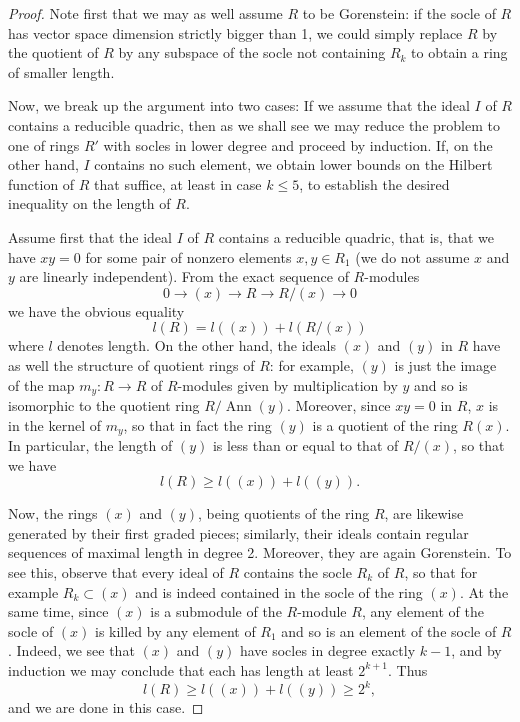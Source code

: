 \documentclass{bull-l}
\newcommand{\Ann}{\operatorname{Ann}}
\theoremstyle{pplain}
\theoremstyle{definition}
\begin{document}
\begin{proof} 
Note first that we may as well assume $R$ to be Gorenstein: if the socle of $R$
has vector space dimension strictly bigger than 1, we could simply replace $R$
by the quotient of $R$ by any subspace of the socle not containing $R_k$ to
obtain a ring of smaller length.

Now, we break up the argument into two cases: If we assume that the ideal $I$
of $R$ contains a reducible quadric, then as we shall see we may reduce the
problem to one of rings $R'$ with socles in lower degree and proceed by
induction.  If, on the other hand, $I$ contains no such element, we obtain lower
bounds on the Hilbert function of $R$ that suffice, at least in case $k\le 5$,
to establish the desired inequality on the length of $R$.

Assume first that the ideal $I$ of $R$ contains a reducible quadric, that is,
that we have $xy=0$ for some pair of nonzero elements $x,y\in  R_1$ (we do not
assume $x$ and $y$ are linearly independent).  From the exact sequence of
$R$-modules 
\[0\to (x)\to R\to R/(x)\to 0\]
we have the obvious equality
\[l(R)=l((x))+l(R/(x))\]
where $l$ denotes length.  On the other hand, the ideals $(x)$ and $(y)$ in $R$
have as well the structure of quotient rings of $R$: for example, $(y)$ is just
the image of the map $m_y:R\to R$ of $R$-modules given by multiplication by $y$
and so is isomorphic to the quotient ring $R/\Ann(y)$. Moreover, since $xy=0$
in $R$, $x$ is in the kernel of $m_y$, so that in fact the ring $(y)$ is a
quotient of the ring $R(x)$.  In particular, the length of $(y)$ is less than
or equal to that of $R/(x)$, so that we have
\[l(R)\ge l((x))+l((y)).\]

Now, the rings $(x)$ and $(y)$, being quotients of the ring $R$, are likewise
generated by their first graded pieces; similarly, their ideals contain regular 
sequences of maximal length in degree 2.  Moreover, they are again Gorenstein. 
To see this, observe that every ideal of $R$ contains the socle $R_k$ of $R$,
so that for example $R_k\subset (x)$ and is indeed contained in the socle of
the ring $(x)$.  At the same time, since $(x)$ is a submodule of the $R$-module
$R$, any element of the socle of $(x)$ is killed by any element of $R_1$ and so
is an element of the socle of $R$.  Indeed, we see that $(x)$ and $(y)$ have
socles in degree exactly $k-1$, and by induction we may conclude that each has
length at least $2^{k+1}$.  Thus
\[l(R)\ge l((x))+l((y))\ge 2^k,\]
and we are done in this case.


\end{proof}
\end{document}
